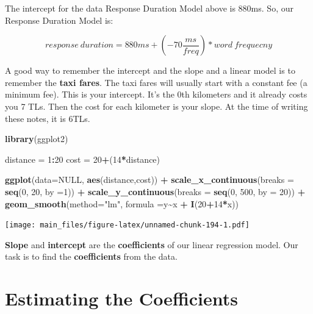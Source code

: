 \documentclass[
]{book}
\newenvironment{Shaded}{\begin{snugshade}}{\end{snugshade}}
\newcommand{\AttributeTok}[1]{\textcolor[rgb]{0.13,0.29,0.53}{#1}}
\newcommand{\ConstantTok}[1]{\textcolor[rgb]{0.56,0.35,0.01}{#1}}
\newcommand{\DecValTok}[1]{\textcolor[rgb]{0.00,0.00,0.81}{#1}}
\newcommand{\FunctionTok}[1]{\textcolor[rgb]{0.13,0.29,0.53}{\textbf{#1}}}
\newcommand{\NormalTok}[1]{#1}
\newcommand{\OtherTok}[1]{\textcolor[rgb]{0.56,0.35,0.01}{#1}}
\newcommand{\SpecialCharTok}[1]{\textcolor[rgb]{0.81,0.36,0.00}{\textbf{#1}}}
\newcommand{\StringTok}[1]{\textcolor[rgb]{0.31,0.60,0.02}{#1}}
\begin{document}
The intercept for the data Response Duration Model above is 880ms. So, our Response Duration Model is:

\[response\ duration = 880ms + (-70 \frac{ms}{freq}) * word\ frequecny   \]

A good way to remember the intercept and the slope and a linear model is to remember the \textbf{taxi fares}. The taxi fares will usually start with a constant fee (a minimum fee). This is your intercept. It's the 0th kilometers and it already costs you 7 TLs. Then the cost for each kilometer is your slope. At the time of writing these notes, it is 6TLs.

\begin{Shaded}
\begin{Highlighting}[]
\FunctionTok{library}\NormalTok{(ggplot2)}

\NormalTok{distance }\OtherTok{=} \DecValTok{1}\SpecialCharTok{:}\DecValTok{20}
\NormalTok{cost }\OtherTok{=} \DecValTok{20}\SpecialCharTok{+}\NormalTok{(}\DecValTok{14}\SpecialCharTok{*}\NormalTok{distance)}

\FunctionTok{ggplot}\NormalTok{(}\AttributeTok{data=}\ConstantTok{NULL}\NormalTok{, }\FunctionTok{aes}\NormalTok{(distance,cost)) }\SpecialCharTok{+}
  \FunctionTok{scale\_x\_continuous}\NormalTok{(}\AttributeTok{breaks =} \FunctionTok{seq}\NormalTok{(}\DecValTok{0}\NormalTok{, }\DecValTok{20}\NormalTok{, }\AttributeTok{by =}\DecValTok{1}\NormalTok{)) }\SpecialCharTok{+}
  \FunctionTok{scale\_y\_continuous}\NormalTok{(}\AttributeTok{breaks =} \FunctionTok{seq}\NormalTok{(}\DecValTok{0}\NormalTok{, }\DecValTok{500}\NormalTok{, }\AttributeTok{by =} \DecValTok{20}\NormalTok{)) }\SpecialCharTok{+} 
  \FunctionTok{geom\_smooth}\NormalTok{(}\AttributeTok{method=}\StringTok{"lm"}\NormalTok{, }\AttributeTok{formula =}\NormalTok{y}\SpecialCharTok{\textasciitilde{}}\NormalTok{x }\SpecialCharTok{+} \FunctionTok{I}\NormalTok{(}\DecValTok{20}\SpecialCharTok{+}\DecValTok{14}\SpecialCharTok{*}\NormalTok{x))}
\end{Highlighting}
\end{Shaded}

\texttt{[image: main\_files/figure-latex/unnamed-chunk-194-1.pdf]}

\textbf{Slope} and \textbf{intercept} are the \textbf{coefficients} of our linear regression model. Our task is to find the \textbf{coefficients} from the data.

\hypertarget{estimating-the-coefficients}{%
\section{Estimating the Coefficients}\label{estimating-the-coefficients}}
\end{document}
